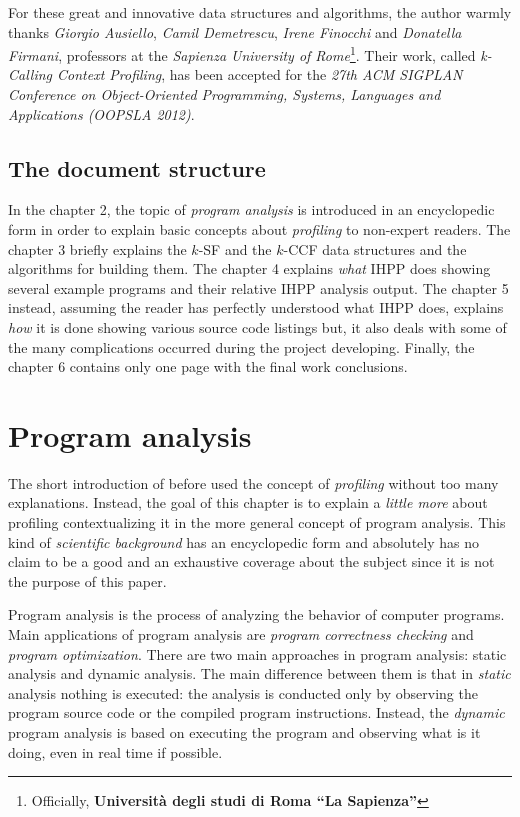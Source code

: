 \documentclass[a4paper,10pt]{report}
\begin{document}
For these great and innovative data structures and algorithms, the author warmly
thanks \emph{Giorgio Ausiello}, \emph{Camil Demetrescu}, \emph{Irene Finocchi}
and \emph{Donatella Firmani}, professors at the \emph{Sapienza University of
Rome}\footnote{Officially, \textbf{Universit\`a degli studi di Roma ``La
Sapienza''}}.
Their work, called \emph{\mbox{k-Calling} \mbox{Context} \mbox{Profiling}}, has
been accepted for the \emph{27th \mbox{ACM} \mbox{SIGPLAN} Conference on
Object-Oriented Programming, Systems, Languages and Applications (OOPSLA 2012)}.

\section{The document structure}
In the chapter 2, the topic of \emph{program analysis} is
introduced in an encyclopedic form in order to explain
basic concepts about \emph{profiling} to non-expert readers. 
The chapter 3 briefly explains the $k$-SF and the $k$-CCF data structures
and the algorithms for building them. The chapter 4 explains \emph{what} 
IHPP does showing several example programs and their relative IHPP analysis 
output. The chapter 5 instead, assuming the reader has perfectly understood 
what IHPP does, explains \emph{how} it is done showing various
source code listings but, it also deals with some of the many complications occurred
during the project developing. Finally, the chapter 6 contains only one
page with the final work conclusions.

\chapter{Program analysis}
The short introduction of before used the concept of \emph{profiling} without
too many explanations.
Instead, the goal of this chapter is to explain a \emph{little more} about
profiling contextualizing it in the more general concept of program analysis.
This kind of \emph{scientific background} has an encyclopedic form and
absolutely has no claim to be a good and an exhaustive coverage about the
subject since it is not the purpose of this paper.

Program analysis is the process of analyzing the behavior of computer
programs. Main applications of program analysis are 
\emph{program correctness checking} and \emph{program optimization}.
There are two main approaches in program analysis: static analysis and dynamic analysis.
The main difference between them is that in \emph{static} analysis nothing is
executed: the analysis is conducted only by observing the program source code or
the compiled program instructions. Instead, the \emph{dynamic} program analysis
is based on executing the program and observing what is it doing, even in real
time if possible.
\end{document}

